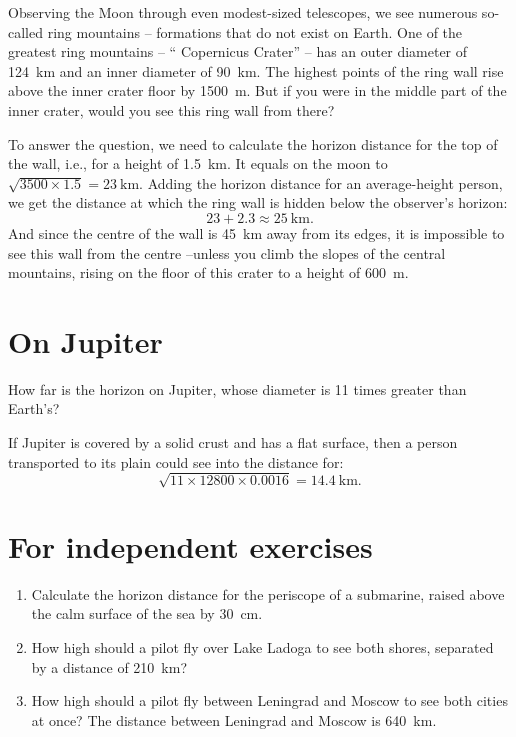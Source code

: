 \ques Observing the Moon through even modest-sized telescopes, we see numerous so-called ring mountains -- formations that do not exist on Earth. One of the greatest ring mountains -- `` Copernicus Crater'' -- has an outer diameter of \SI{124}{\kilo\meter} and an inner diameter of \SI{90}{\kilo\meter}. The highest points of the ring wall rise above the inner crater floor by \SI{1500}{\meter}. But if you were in the middle part of the inner crater, would you see this ring wall from there?

\ans To answer the question, we need to calculate the horizon distance for the top of the wall, i.e., for a height of \SI{1.5}{\kilo\meter}. It equals on the moon to $\sqrt{3500 \times 1.5} = \SI{23}{\kilo\meter}$. Adding the horizon distance for an average-height person, we get the distance at which the ring wall is hidden below the observer's horizon:
\begin{equation*}%
23 + 2.3 \approx \SI{25}{\kilo\meter}.
\end{equation*}
And since the centre of the wall is \SI{45}{\kilo\meter} away from its edges, it is impossible to see this wall from the centre --unless you climb the slopes of the central mountains, rising on the floor of this crater to a height of \SI{600}{\meter}.

\section{On Jupiter}
\label{sec-6.12}

\ques How far is the horizon on Jupiter, whose diameter is 11 times greater than Earth's?

\ans If Jupiter is covered by a solid crust and has a flat surface, then a person transported to its plain could see into the distance for:
\begin{equation*}%
\sqrt{11 \times 12800 \times 0.0016} = \SI{14.4}{\kilo\meter}.
\end{equation*}

\section*{For independent exercises}
\begin{enumerate}
\item Calculate the horizon distance for the periscope of a submarine, raised above the calm surface of the sea by \SI{30}{\centi\meter}.

\item How high should a pilot fly over Lake Ladoga to see both shores, separated by a distance of \SI{210}{\kilo\meter}?

\item How high should a pilot fly between Leningrad and Moscow to see both cities at once? The distance between Leningrad and Moscow is \SI{640}{\kilo\meter}.
\end{enumerate}


